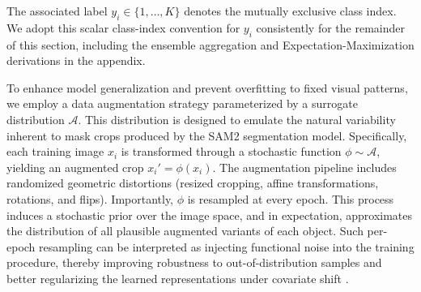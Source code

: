 \documentclass[11pt]{elsarticle}
\begin{document}
The associated label $y_i \in \{1, \ldots, K\}$ denotes the mutually exclusive class index. We adopt this scalar class-index convention for $y_i$ consistently for the remainder of this section, including the ensemble aggregation and Expectation-Maximization derivations in the appendix.

To enhance model generalization and prevent overfitting to fixed visual patterns, we employ a data augmentation strategy parameterized by a surrogate distribution $\mathcal{A}$. This distribution is designed to emulate the natural variability inherent to mask crops produced by the SAM2 segmentation model. Specifically, each training image $x_i$ is transformed through a stochastic function $\phi \sim \mathcal{A}$, yielding an augmented crop $x_i' = \phi(x_i)$. The augmentation pipeline includes randomized geometric distortions (resized cropping, affine transformations, rotations, and flips). Importantly, $\phi$ is resampled at every epoch. This process induces a stochastic prior over the image space, and in expectation, approximates the distribution of all plausible augmented variants of each object. Such per-epoch resampling can be interpreted as injecting functional noise into the training procedure, thereby improving robustness to out-of-distribution samples and better regularizing the learned representations under covariate shift \citep{chapelle2001vicinal, zhang2018mixup, cubuk2019autoaugment}.
\end{document}
